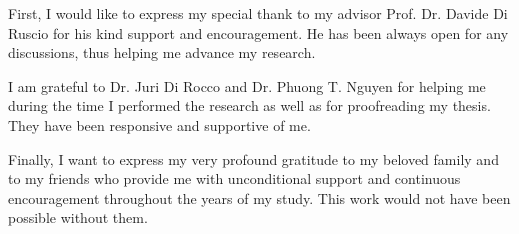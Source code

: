 \documentclass[
11pt, %
english, %
singlespacing, %
headsepline, %
]{MastersDoctoralThesis} %
\begin{document}
	
	
	
	
	
	\vspace*{0.2\textheight}
	
	
	
	
	
	\begin{acknowledgements}
		\addchaptertocentry{\acknowledgementname} %
		
		First, I would like to express my special thank to my advisor Prof. Dr. Davide Di Ruscio for his kind support and encouragement. He has been always open for any discussions, thus helping me advance my research.%
		
		I am grateful to Dr. Juri Di Rocco and Dr. Phuong T. Nguyen for helping me during the time I performed the research as well as for proofreading my thesis. They have been responsive and supportive of me.%
		
		Finally, I want to express my very profound gratitude to my beloved family and to my friends who provide me with unconditional support and continuous encouragement throughout the years of my study. This work would not have been possible without them.
		
	\end{acknowledgements}
	
\end{document}
